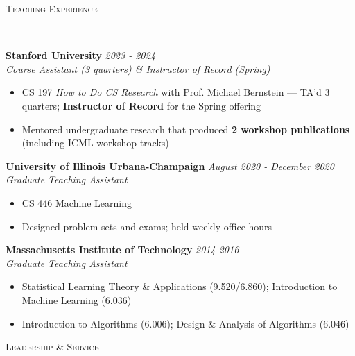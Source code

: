 \documentclass{article}
\newenvironment{changemargin}[2]{%
  \begin{list}{}{%
    \setlength{\topsep}{0pt}%
    \setlength{\leftmargin}{#1}%
    \setlength{\rightmargin}{#2}%
    \setlength{\listparindent}{\parindent}%
    \setlength{\itemindent}{\parindent}%
    \setlength{\parsep}{\parskip}%
  }%
  \item[]}{\end{list}
}
\newcommand{\lineover}{
	\begin{changemargin}{-0.05in}{-0.05in}
		\vspace*{-8pt}
		\hrulefill \\
		\vspace*{-2pt}
	\end{changemargin}
}
\newcommand{\header}[1]{
	\begin{changemargin}{-0.5in}{-0.5in}
		\scshape{#1}\\
  	\lineover
	\end{changemargin}
	\nopagebreak[4]    %
}
\newenvironment{body} {
		\vspace*{-16pt}
		\begin{changemargin}{-0.25in}{-0.5in}
	  }
		{\end{changemargin}\vspace{8pt plus 12pt}
	}
\begin{document}

\header{Teaching Experience}
\begin{body}
	\vspace{12pt}

    \textbf{Stanford University} \hfill \emph{2023 - 2024}\\
	\emph{Course Assistant (3 quarters) \& Instructor of Record (Spring)}\\
	\vspace*{-3pt}
	\begin{itemize} \itemsep -2pt
		\item CS 197 \textit{How to Do CS Research} with Prof. Michael Bernstein --- TA'd 3 quarters; \textbf{Instructor of Record} for the Spring offering
		\item Mentored undergraduate research that produced \textbf{2 workshop publications} (including ICML workshop tracks)
	\end{itemize}

    \textbf{University of Illinois Urbana-Champaign} \hfill \emph{August 2020 - December 2020}\\
	\emph{Graduate Teaching Assistant}\\
	\vspace*{-3pt}
	\begin{itemize} \itemsep -2pt
		\item CS 446 Machine Learning
		\item Designed problem sets and exams; held weekly office hours
	\end{itemize}
    
    \textbf{Massachusetts Institute of Technology} \hfill \emph{2014-2016}\\
	\emph{Graduate Teaching Assistant}\\
	\vspace*{-3pt}
	\begin{itemize} \itemsep -2pt
	\item Statistical Learning Theory \& Applications (9.520/6.860); Introduction to Machine Learning (6.036)
        \item Introduction to Algorithms (6.006); Design \& Analysis of Algorithms (6.046)
	\end{itemize}
\end{body}

\header{Leadership \& Service}
\end{document}
